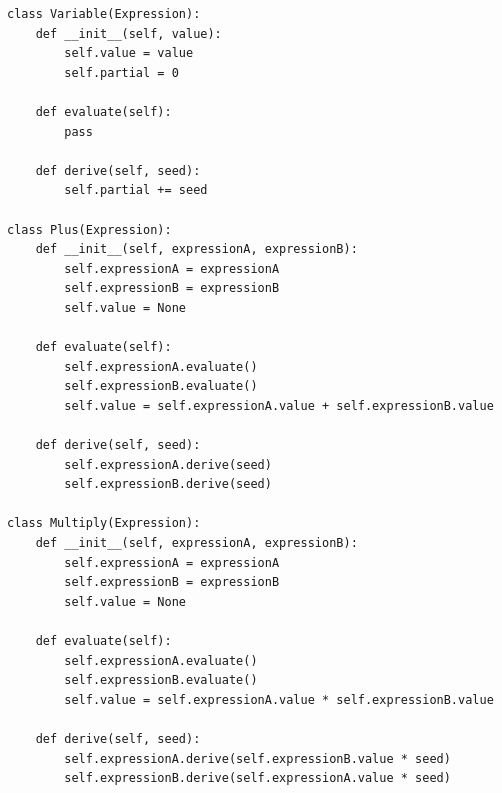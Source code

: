 \documentclass[zavrsnirad]{fer}
\begin{document}
\begin{lstlisting}[caption={Primjer implementacije unazadne metode u programskom jeziku \textit{Python} \cite{wiki:autodiff}}]
class Variable(Expression):
    def __init__(self, value):
        self.value = value
        self.partial = 0

    def evaluate(self):
        pass

    def derive(self, seed):
        self.partial += seed

class Plus(Expression):
    def __init__(self, expressionA, expressionB):
        self.expressionA = expressionA
        self.expressionB = expressionB
        self.value = None

    def evaluate(self):
        self.expressionA.evaluate()
        self.expressionB.evaluate()
        self.value = self.expressionA.value + self.expressionB.value

    def derive(self, seed):
        self.expressionA.derive(seed)
        self.expressionB.derive(seed)

class Multiply(Expression):
    def __init__(self, expressionA, expressionB):
        self.expressionA = expressionA
        self.expressionB = expressionB
        self.value = None

    def evaluate(self):
        self.expressionA.evaluate()
        self.expressionB.evaluate()
        self.value = self.expressionA.value * self.expressionB.value

    def derive(self, seed):
        self.expressionA.derive(self.expressionB.value * seed)
        self.expressionB.derive(self.expressionA.value * seed)
\end{lstlisting}

\pagebreak
\end{document}
